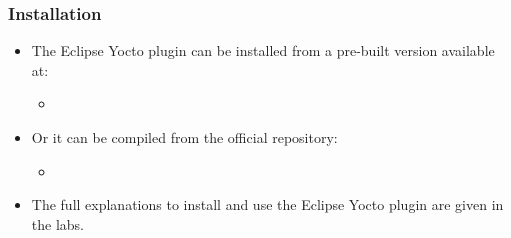 \begin{frame}
  \frametitle{Installation}
  \begin{itemize}
    \item The Eclipse Yocto plugin can be installed from a pre-built
      version available at:
      \begin{itemize}
        \item {}
      \end{itemize}
    \item Or it can be compiled from the official repository:
      \begin{itemize}
        \item {}
      \end{itemize}
    \item The full explanations to install and use the Eclipse Yocto
      plugin are given in the labs.
  \end{itemize}
\end{frame}
